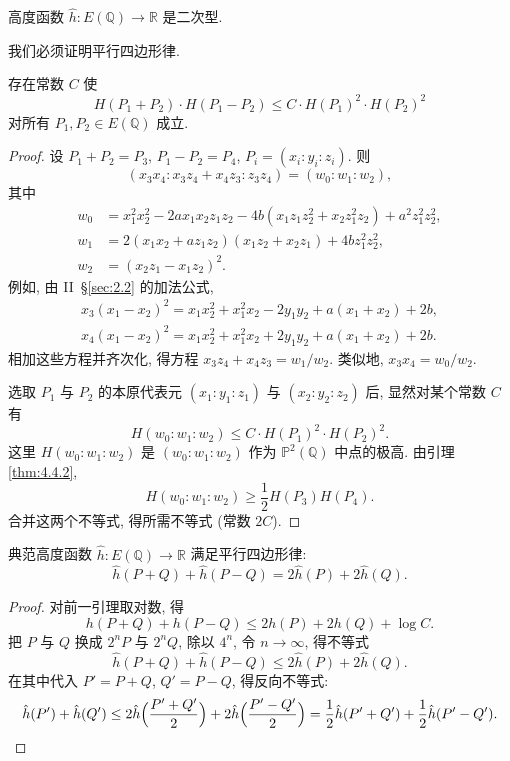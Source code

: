 \begin{proposition} \label{thm:4.4.9} 
高度函数 $\hat{h}\colon E(\mathbb{Q})\to\mathbb{R}$ 是二次型.
\end{proposition}

我们必须证明平行四边形律.

\begin{lemma} \label{thm:4.4.10} 
存在常数 $C$ 使
\[
H(P_1+P_2)\cdot H(P_1-P_2)\le C\cdot H(P_1)^2\cdot H(P_2)^2
\]
对所有 $P_1, P_2\in E(\mathbb{Q})$ 成立.
\end{lemma}

\begin{proof}
设 $P_1 + P_2 = P_3$, $P_1 - P_2 = P_4$, $P_i = (x_i:y_i:z_i)$. 则
\[
(x_3x_4:x_3z_4 + x_4z_3:z_3z_4) = (w_0:w_1:w_2),
\]
其中
\begin{align*}
    w_0 & = x_1^2x_2^2 - 2ax_1x_2z_1z_2 - 4b(x_1z_1z_2^2 + x_2z_1^2z_2) + a^2z_1^2z_2^2,\\
    w_1 & = 2(x_1x_2 + az_1z_2)(x_1z_2 + x_2z_1) + 4bz_1^2z_2^2,\\
    w_2 & = (x_2z_1 - x_1z_2)^2.
\end{align*}
例如, 由 II~\S\ref{sec:2.2} 的加法公式,
\begin{align*}
    x_3(x_1 - x_2)^2 = x_1x_2^2 + x_1^2x_2 - 2y_1y_2 + a(x_1 + x_2) + 2b,\\
    x_4(x_1 - x_2)^2 = x_1x_2^2 + x_1^2x_2 + 2y_1y_2 + a(x_1 + x_2) + 2b.
\end{align*}
相加这些方程并齐次化, 得方程 $x_3z_4 + x_4z_3 = w_1/w_2$. 类似地, $x_3x_4 = w_0/w_2$.

选取 $P_1$ 与 $P_2$ 的本原代表元 $(x_1:y_1:z_1)$ 与 $(x_2:y_2:z_2)$ 后, 显然对某个常数 $C$ 有
\[
H(w_0:w_1:w_2)\le C\cdot H(P_1)^2\cdot H(P_2)^2.
\]
这里 $H(w_0:w_1:w_2)$ 是 $(w_0:w_1:w_2)$ 作为 $\mathbb{P}^2(\mathbb{Q})$ 中点的极高. 由引理 \ref{thm:4.4.2},
\[
H(w_0:w_1:w_2)\ge\frac{1}{2}H(P_3)H(P_4).
\]
合并这两个不等式, 得所需不等式 (常数 $2C$).
\end{proof}

\begin{lemma} \label{thm:4.4.11} 
典范高度函数 $\hat{h}\colon E(\mathbb{Q})\to\mathbb{R}$ 满足平行四边形律:
\[
\hat{h}(P+Q) + \hat{h}(P-Q) = 2\hat{h}(P) + 2\hat{h}(Q).
\]
\end{lemma}

\begin{proof}
对前一引理取对数, 得
\[
h(P+Q) + h(P-Q)\le 2h(P) + 2h(Q) + \log C.
\]
把 $P$ 与 $Q$ 换成 $2^nP$ 与 $2^nQ$, 除以 $4^n$, 令 $n\to\infty$, 得不等式
\[
\hat{h}(P+Q) + \hat{h}(P-Q)\le 2\hat{h}(P) + 2\hat{h}(Q).
\]
在其中代入 $P' = P+Q$, $Q' = P-Q$, 得反向不等式:
\[
\hat{h}(P') + \hat{h}(Q')\le 2\hat{h}\Bigl(\frac{P'+Q'}{2}\Bigr) + 2\hat{h}\Bigl(\frac{P'-Q'}{2}\Bigr) = \frac{1}{2}\hat{h}(P'+Q') + \frac{1}{2}\hat{h}(P'-Q').
\]
\end{proof}

